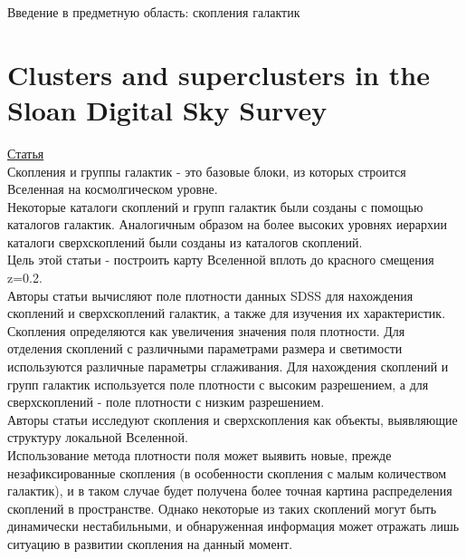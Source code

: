 \documentclass{article}
\begin{document}
\begin{center}{\huge Введение в предметную область: скопления галактик\\}\end{center}

\section{Clusters and superclusters in the Sloan Digital Sky Survey}
\hyperlink{https://www.aanda.org/articles/aa/pdf/2003/26/aah4162.pdf}{Статья}\\

Скопления и группы галактик - это базовые блоки, из которых строится Вселенная на космолгическом 
уровне.\\

Некоторые каталоги скоплений и групп галактик были созданы с помощью каталогов галактик. Аналогичным 
образом на более высоких уровнях иерархии каталоги сверхскоплений были созданы из каталогов скоплений.\\

Цель этой статьи - построить карту Вселенной вплоть до красного смещения z=0.2.\\

Авторы статьи вычисляют поле плотности данных SDSS для нахождения скоплений и сверхскоплений галактик,
а также для изучения их характеристик.\\

Скопления определяются как увеличения значения поля плотности. Для отделения скоплений с различными
параметрами размера и светимости используются различные параметры сглаживания. Для нахождения 
скоплений и групп галактик используется поле плотности с высоким разрешением, а для сверхскоплений 
- поле плотности с низким разрешением.\\ 

Авторы статьи исследуют скопления и сверхскопления как объекты, выявляющие структуру локальной 
Вселенной.\\

Использование метода плотности поля может выявить новые, прежде незафиксированные скопления (в 
особенности скопления с малым количеством галактик), и в таком случае будет получена более точная 
картина распределения скоплений в пространстве. Однако некоторые из таких скоплений могут быть 
динамически нестабильными, и обнаруженная информация может отражать лишь ситуацию в развитии 
скопления на данный момент.\\
\end{document}
